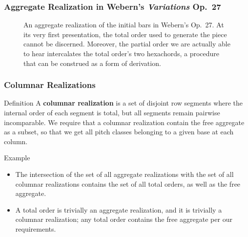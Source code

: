 \begin{frame}[fragile]
	\frametitle{Aggregate Realization in Webern's \emph{Variations} Op.~27}
	\begin{figure}
		\centering
		\begin{adjustbox}{width=\textwidth}
		\end{adjustbox}
		\caption{An aggregate realization of the initial bars in Webern's Op.~27. At its very first presentation, the total order used to generate the piece cannot be discerned. Moreover, the partial order we are actually able to hear intercalates the total order's two hexachords, a procedure that can be construed as a form of derivation.}
	\end{figure}
\end{frame}

\begin{frame}
	\frametitle{Columnar Realizations}
	\begin{block}{Definition}
		A \textbf{columnar realization} is a set of disjoint row segments where the internal order of each segment is total, but all segments remain pairwise incomparable. We require that a columnar realization contain the free aggregate as a subset, so that we get all pitch classes belonging to a given base at each column.
	\end{block}
	\begin{block}{Example}
		\begin{itemize}
			\item The intersection of the set of all aggregate realizations with the set of all columnar realizations contains the set of all total orders, as well as the free aggregate.
			\item A total order is trivially an aggregate realization, and it is trivially a columnar realization; any total order contains the free aggregate per our requirements.
		\end{itemize}
	\end{block}
\end{frame}

